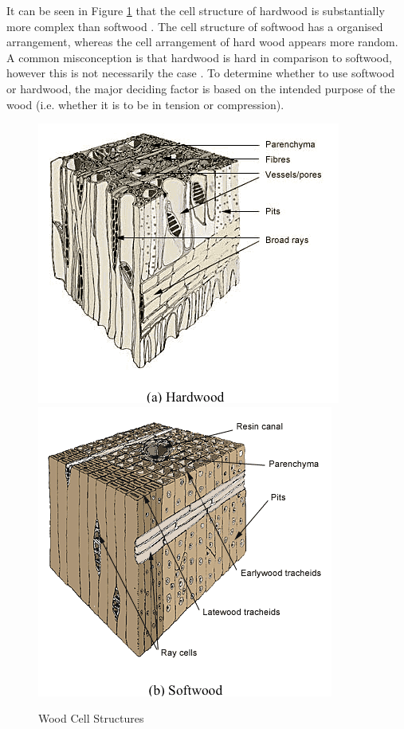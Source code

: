 \documentclass[11pt,a4paper]{article}
\numberwithin{equation}{subsection}
\begin{document}
	\vspace*{\baselineskip}
	
	\noindent
	It can be seen in Figure \ref{fig:Wood} that the cell structure of hardwood is substantially more complex than softwood \cite{mohanty_natural_2005}. The cell structure of softwood has a organised arrangement, whereas the cell arrangement of hard wood appears more random. A common misconception is that hardwood is hard in comparison to softwood, however this is not necessarily the case \cite{pipinato_innovative_2015,marshall_black_2005}. To determine whether to use softwood or hardwood, the major deciding factor is based on the intended purpose of the wood (i.e. whether it is to be in tension or compression).
	
		\begin{figure}[h]
			\includegraphics[scale=0.6]{Hardwoods}
			\includegraphics[scale=0.6]{Softwoods}	
			\caption{Wood Cell Structures \cite{_softwood_2016}}
			\label{fig:Wood}
		\end{figure}
	
\end{document}
